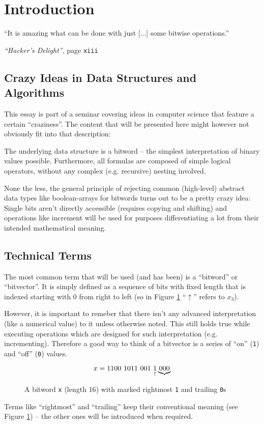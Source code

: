 \section{Introduction}\label{sec:introduction}
\epigraph{
``It is amazing what can be done
with just [...] some bitwise operations.''
}{
\emph{``Hacker's Delight''}, page \texttt{xiii}
\cite{Warren:2012:HD:2462741}
}


\subsection*{Crazy Ideas in Data Structures and Algorithms}
This essay is part of a seminar covering
ideas in computer science that feature a certain ``craziness''.
The content that will be presented here
might however not obviously fit into that description:

The underlying data structure is a bitword
-- the simplest interpretation of binary values possible.
Furthermore, all formulas are composed of simple logical operators,
without any complex (e.g. recursive) nesting involved.

None the less, the general principle of rejecting
common (high-level) abstract data types like boolean-arrays
for bitwords turns out to be a pretty crazy idea:
Single bits aren't directly accessible (requires copying and shifting)
and operations like increment will be used for
purposes differentiating a lot from their intended mathematical meaning.

\subsection*{Technical Terms}
The most common term that will be used (and has been)
is a ``bitword'' or ``bitvector''.
It is simply defined as a sequence of bits with fixed length
that is indexed starting with $0$ from right to left
(so in Figure \ref{fig:bitword} ``$\uparrow$'' refers to $x_3$).

However, it is important to remeber that
there isn't any advanced interpretation (like a numerical value) to it
unless otherwise noted.
This still holds true while executing operations
which are designed for such interpretation (e.g. incrementing).
Therefore a good way to think of a bitvector
is a series of ``on'' (\lstinline{1}) and ``off'' (\lstinline{0}) values.

\begin{figure}[h]
\label{fig:bitword}
\[
x = \lstinline{1100 1011 001 }
\underset{\uparrow}{\lstinline{1}}
\underbrace{\lstinline{000}}
\]
\caption{
A bitword \lstinline{x} (length $16$)
with marked rightmost \lstinline{1} and trailing \lstinline{0}s
}
\end{figure}

Terms like ``rightmost'' and ``trailing''
keep their conventional meaning (see Figure \ref{fig:bitword})
-- the other ones will be introduced when required.
